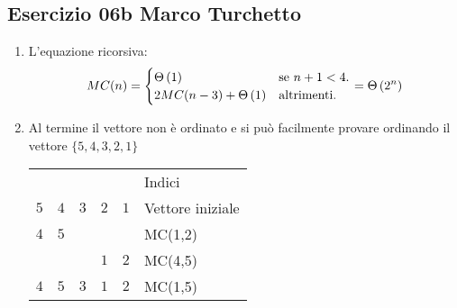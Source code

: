 
\subsection[06b MT]{Esercizio 06b Marco Turchetto}
\begin{enumerate}[label=\alph*)]
\item L'equazione ricorsiva: 
	\begin{equation*}
		MC(n)=\begin{cases}
			\Theta\left(1\right)				& \text{se $n +1  < 4$}.\\
			2MC(n - 3) + \Theta\left(1\right)	& \text{altrimenti}.
 		\end{cases}
		= \Theta\left(2^n\right)
	\end{equation*}
	
	
	
\item Al termine il vettore non è ordinato e si può facilmente provare ordinando il vettore $ \{ 5, 4, 3, 2, 1 \} $
	
	\begin{center}
		\begin{tabular}{*{5}{|c}|l}
			 &  &  &  &  & Indici \\ 
			$5$ & $4$ & $3$ & $2$ & $1$ & Vettore iniziale \\ 
			$4$ & $5$ &     &     &     & MC(1,2) \\ 
			    &     &     & $1$ & $2$ & MC(4,5) \\ 
			$4$ & $5$ & $3$ & $1$ & $2$ & MC(1,5) \\ 
		\end{tabular}
	\end{center}
\end{enumerate}
